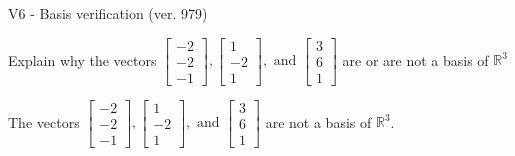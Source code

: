 \begin{exercise}
  \begin{exerciseTitle}V6 - Basis verification (ver. 979)\end{exerciseTitle}
  \begin{exerciseStatement}
    Explain why the vectors \(\left[\begin{array}{r}
-2 \\
-2 \\
-1
\end{array}\right] , \left[\begin{array}{r}
1 \\
-2 \\
1
\end{array}\right] , \text{ and } \left[\begin{array}{r}
3 \\
6 \\
1
\end{array}\right]\) are or are not a basis of \(\mathbb{R}^3\)	


  \end{exerciseStatement}
  \begin{exerciseAnswer}
   The vectors \(\left[\begin{array}{r}
-2 \\
-2 \\
-1
\end{array}\right] , \left[\begin{array}{r}
1 \\
-2 \\
1
\end{array}\right] , \text{ and } \left[\begin{array}{r}
3 \\
6 \\
1
\end{array}\right]\) 
  	 are not  a basis of \(\mathbb{R}^3\).
  


  \end{exerciseAnswer}
\end{exercise}